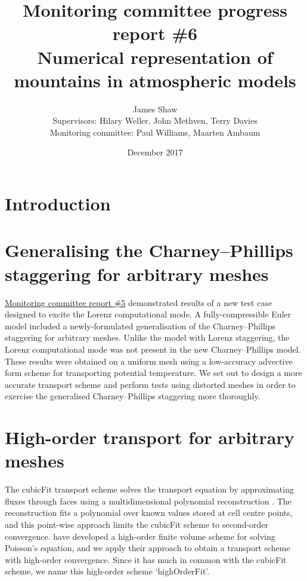 \documentclass[a4paper,11pt]{article}
\title{
\vspace*{-2em}
Monitoring committee progress report \#6\\
\vspace*{1em}
\Large{Numerical representation of mountains in atmospheric models}}
\author{James Shaw
\vspace{0.5em} \\
\large{Supervisors: Hilary Weller, John Methven, Terry Davies}
\vspace{0.5em} \\
\large{Monitoring committee: Paul Williams, Maarten Ambaum}}
\date{December 2017}
\begin{document}
\maketitle

\section{Introduction}

\section{Generalising the Charney--Phillips staggering for arbitrary meshes}

\href{http://www.datumedge.co.uk/publications/mc-report-2017-06.pdf}{Monitoring committee report \#5} demonstrated results of a new test case designed to excite the Lorenz computational mode.  A fully-compressible Euler model included a newly-formulated generalisation of the Charney--Phillips staggering for arbitrary meshes.
Unlike the model with Lorenz staggering, the Lorenz computational mode was not present in the new Charney--Phillips model.
These results were obtained on a uniform mesh using a low-accuracy advective form scheme for transporting potential temperature.  We set out to design a more accurate transport scheme and perform tests using distorted meshes in order to exercise the generalised Charney--Phillips staggering more thoroughly.


\section{High-order transport for arbitrary meshes}

The cubicFit transport scheme solves the transport equation by approximating fluxes through faces using a multidimensional polynomial reconstruction \citep{shaw2017}.
The reconstruction fits a polynomial over known values stored at cell centre points, and this point-wise approach limits the cubicFit scheme to second-order convergence.
\citet{devendran2017} have developed a high-order finite volume scheme for solving Poisson's equation, and we apply their approach to obtain a transport scheme with high-order convergence.
Since it has much in common with the cubicFit scheme, we name this high-order scheme `highOrderFit'. 
\end{document}
